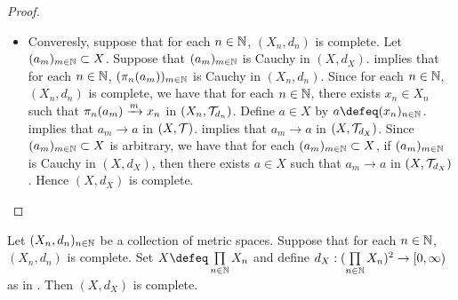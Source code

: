 \documentclass{book}
\begin{document}
\begin{proof}
\begin{itemize}
		\item Converesly, suppose that for each $n \in \mathbb{N}$, $(X_n, d_n)$ is complete. Let $(a_m)_{m \in \mathbb{N}} \subset X$. Suppose that $(a_m)_{m \in \mathbb{N}}$ is Cauchy in $(X, d_X)$.  implies that for each $n \in \mathbb{N}$, $(\pi_n(a_m))_{m \in \mathbb{N}}$ is Cauchy in $(X_n, d_n)$. Since for each $n \in \mathbb{N}$, $(X_n, d_n)$ is complete, we have that for each $n \in \mathbb{N}$, there exists $x_n \in X_n$ such that $\pi_n(a_m) \xrightarrow{m} x_n$ in $(X_n, \mathcal{T}_{d_n})$. Define $a \in X$ by $a \defeq (x_n)_{n \in \N}$.  implies that $a_m \rightarrow a$ in $(X, \mathcal{T})$.  implies that $a_m \rightarrow a$ in $(X, \mathcal{T}_{d_X})$. Since $(a_m)_{m \in \mathbb{N}} \subset X$ is arbitrary, we have that for each $(a_m)_{m \in \mathbb{N}} \subset X$, if $(a_m)_{m \in \mathbb{N}}$ is Cauchy in $(X, d_X)$, then there exists $a \in X$ such that $a_m \rightarrow a$ in $(X, \mathcal{T}_{d_X})$. Hence $(X, d_X)$ is complete.
	\end{itemize}
\end{proof}

\begin{ex} 
	Let $(X_n, d_n)_{n \in \mathbb{N}}$ be a collection of metric spaces. Suppose that for each $n \in \mathbb{N}$, $(X_n, d_n)$ is complete. Set $X \defeq \prod\limits_{n \in \N} X_n$ and define $d_X: (\prod\limits_{n \in \mathbb{N}} X_n)^2 \rightarrow [0,\infty)$ as in . Then $(X, d_X)$ is complete.  
\end{ex}
\end{document}
